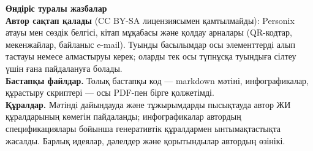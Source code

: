 \clearpage
\thispagestyle{empty}
\begin{flushleft}\small\sffamily
\textbf{Өндіріс туралы жазбалар}\\[1.2em]

\textbf{Автор сақтап қалады} (CC BY-SA лицензиясымен қамтылмайды): Personix
атауы мен сөздік белгісі, кітап мұқабасы және қолдау арналары (QR-кодтар,
мекенжайлар, байланыс e-mail). Туынды басылымдар осы элементтерді алып тастауы
немесе алмастыруы керек; оларды тек осы түпнұсқа туындыға сілтеу үшін ғана
пайдалануға болады.\\[1.2em]

\textbf{Бастапқы файлдар.} Толық бастапқы код --- markdown мәтіні, инфографикалар,
құрастыру скриптері --- осы PDF-пен бірге қолжетімді.\\[1.2em]

\textbf{Құралдар.} Мәтінді дайындауда және тұжырымдарды пысықтауда автор ЖИ
құралдарының көмегін пайдаланды; инфографикалар автордың спецификациялары
бойынша генеративтік құралдармен ынтымақтастықта жасалды. Барлық идеялар,
дәлелдер және қорытындылар автордың өзінікі.
\end{flushleft}
\clearpage
